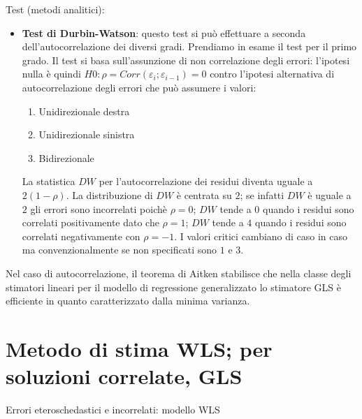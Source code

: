 \documentclass[a4page, 11pt]{article} %
\begin{document}
Test (metodi analitici):
\begin{itemize}
\item \textbf{Test di Durbin-Watson}: questo test si può effettuare a seconda dell’autocorrelazione dei diversi gradi. Prendiamo in esame il test per il primo grado.
Il test si basa sull’assunzione di non correlazione degli errori: l’ipotesi nulla è quindi $H0:  \rho = Corr( \varepsilon_i  ;  \varepsilon_{i-1} )=0$ contro l’ipotesi alternativa di autocorrelazione degli errori che può assumere i valori:
\begin{enumerate}[noitemsep]
\item Unidirezionale destra
\item Unidirezionale sinistra
\item Bidirezionale	
\end{enumerate}
La statistica $DW$ per l'autocorrelazione dei residui diventa uguale a $2(1-\rho)$. 
La distribuzione di $DW$ è centrata su $2$; se infatti $DW$ è uguale a $2$ gli errori sono incorrelati poichè $\rho = 0$; $DW$ tende a $0$ quando i residui sono correlati positivamente dato che $\rho = 1$; $DW$ tende a $4$ quando i residui sono correlati negativamente con $\rho = -1$. I valori critici cambiano di caso in caso ma convenzionalmente se non specificati sono $1$ e $3$. 
\end{itemize}

Nel caso di autocorrelazione, il teorema di Aitken stabilisce che nella classe degli stimatori lineari per il modello di regressione generalizzato lo stimatore GLS è efficiente in quanto caratterizzato dalla minima varianza. 


\section{Metodo di stima WLS; per soluzioni correlate, GLS }

\begin{itshape}
Errori eteroschedastici e incorrelati: modello WLS
\end{itshape}%
\end{document}
